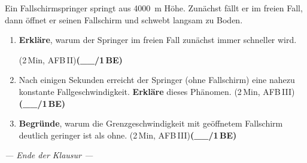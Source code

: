 \documentclass[11pt,a4paper]{article}
\newcommand{\BEZEIT}[3]{%
\hfill{\small\color{zeitgray}(#1\,Min, AFB\,#2)}\quad\textbf{(\_\_/#3\,BE)}%
}
\begin{document}

\noindent{}

\vspace{0.4cm}

Ein Fallschirmspringer springt aus \SI{4000}{\metre} Höhe. Zunächst fällt er im freien Fall, dann öffnet er seinen Fallschirm und schwebt langsam zu Boden.

\vspace{0.3cm}

\begin{enumerate}
\item[a)] \textbf{Erkläre}, warum der Springer im freien Fall zunächst immer schneller wird.

\hfill{\small\color{zeitgray}(2\,Min, AFB\,II)}\quad\textbf{(\_\_/1\,BE)}

\vspace{3.7cm}

\item[b)] Nach einigen Sekunden erreicht der Springer (ohne Fallschirm) eine nahezu konstante Fallgeschwindigkeit. \textbf{Erkläre} dieses Phänomen. \BEZEIT{2}{III}{1}

\vspace{5cm}

\item[c)] \textbf{Begründe}, warum die Grenzgeschwindigkeit mit geöffnetem Fallschirm deutlich geringer ist als ohne. \BEZEIT{2}{III}{1}

\vspace{4cm}

\end{enumerate}

\vspace{1cm}

\begin{center}
\textit{--- Ende der Klausur ---}
\end{center}
\end{document}
